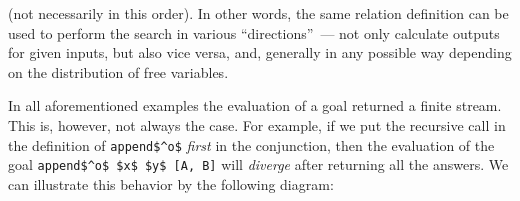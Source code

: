 (not necessarily in this order). In other words, the same relation definition can be used to perform the search in various ``directions''~--- not only calculate
outputs for given inputs, but also vice versa, and, generally in any possible way depending on the distribution of free variables.

In all aforementioned examples the evaluation of a goal returned a finite stream. This is, however, not always the case. For example, if we put the recursive call in the definition of
\lstinline|append$^o$| \emph{first} in the conjunction, then the evaluation of the goal \lstinline|append$^o$ $x$ $y$ [A, B]| will \emph{diverge} after returning all the answers. We
can illustrate this behavior by the following diagram:


